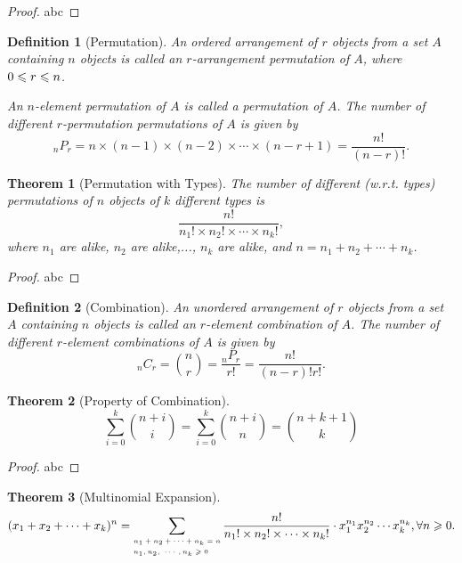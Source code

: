 \documentclass[openany,12pt]{book}
\newtheorem{theorem}{Theorem}[chapter]
\newtheorem{definition}{Definition}[chapter]
\begin{document}
\begin{proof}
  abc
\end{proof}

\begin{definition}[Permutation]
An ordered arrangement of $r$ objects from a set $A$ containing $n$ objects is called an $r$-arrangement permutation of $A$, where $0\leqslant r\leqslant n$. 

An $n$-element permutation of $A$ is called a permutation of $A$. The number of different $r$-permutation permutations of $A$ is given by $$_nP_r =n\times(n-1)\times(n-2)\times\cdots\times(n-r+1)=\frac{n!}{(n-r)!}.$$
\end{definition}

\begin{theorem}[Permutation with Types]
The number of different (w.r.t. types) permutations of $n$ objects of $k$ different types is $$\frac{n!}{n_1 !\times n_2 !\times\cdots\times n_k !},$$
where $n_1$  are alike, $n_2$  are alike,..., $n_k$  are alike, and $n=n_1+n_2+\cdots+n_k $.
\end{theorem}

\begin{proof}
  abc
\end{proof}

\begin{definition}[Combination]
An unordered arrangement of $r$ objects from a set $A$ containing $n$ objects is called an $r$-element combination of $A$. The number of different $r$-element combinations of $A$ is given by 
$$_n C_r =\binom n r=\frac{_n P_r}{r!}=\frac{n!}{(n-r)!r!}.$$
\end{definition}

\begin{theorem}[Property of Combination]
$$\sum_{i=0}^k\binom {n+i} i=\sum_{i=0}^k \binom {n+i} n
=\binom {n+k+1} k$$
\end{theorem}

\begin{proof}
  abc
\end{proof}

\begin{theorem}[Multinomial Expansion]
$$(x_1+x_2+\cdots+x_k )^n=\sum_
{\mbox{\tiny $\begin{aligned}
&n_1+n_2+\cdots+n_k=n \\
&n_1,n_2,\ \cdots,n_k\geqslant0
\end{aligned}$}}
 \frac{n!}{n_1 !\times n_2 !\times\cdots\times n_k !}\cdot x_1^{n_1 } x_2^{n_2 }\cdots x_k^{n_k},\forall n\geqslant0.$$
\end{theorem}
\end{document}

